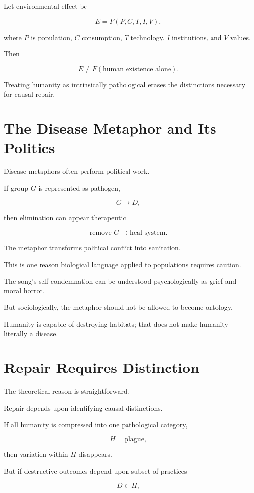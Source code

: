 \documentclass[11pt,oneside]{book}
\theoremstyle{definition}
\theoremstyle{remark}
\begin{document}
Let environmental effect be

\[
E
=
F(P,C,T,I,V),
\]

where \(P\) is population, \(C\) consumption, \(T\) technology, \(I\) institutions, and \(V\) values.

Then

\[
E\neq F(\text{human existence alone}).
\]

Treating humanity as intrinsically pathological erases the distinctions necessary for causal repair.

\section{The Disease Metaphor and Its Politics}

Disease metaphors often perform political work.

If group \(G\) is represented as pathogen,

\[
G\rightarrow D,
\]

then elimination can appear therapeutic:

\[
\text{remove }G
\rightarrow
\text{heal system}.
\]

The metaphor transforms political conflict into sanitation.

This is one reason biological language applied to populations requires caution.

The song's self-condemnation can be understood psychologically as grief and moral horror.

But sociologically, the metaphor should not be allowed to become ontology.

Humanity is capable of destroying habitats; that does not make humanity literally a disease.

\section{Repair Requires Distinction}

The theoretical reason is straightforward.

Repair depends upon identifying causal distinctions.

If all humanity is compressed into one pathological category,

\[
H=\text{plague},
\]

then variation within \(H\) disappears.

But if destructive outcomes depend upon subset of practices

\[
D\subset H,
\]
\end{document}
